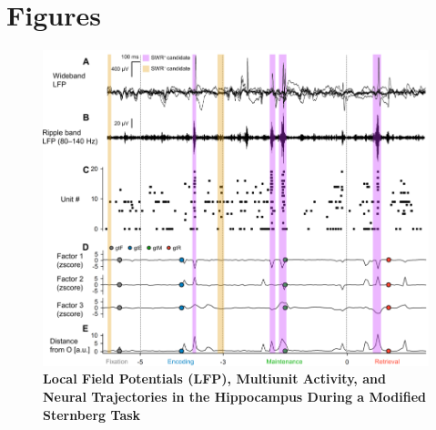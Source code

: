 \documentclass[final,3p,times,twocolumn]{elsarticle}
\begin{document}
\section*{Figures}
\label{figures}
        \clearpage
        \begin{figure}[ht]
        	\centering
            \includegraphics[width=1\textwidth]{./src/figures/.png/Figure_ID_01.png}
        	\caption{\textbf{
Local Field Potentials (LFP), Multiunit Activity, and Neural Trajectories in the Hippocampus During a Modified Sternberg Task
}
\smallskip
\\
}
\end{figure}
\end{document}
